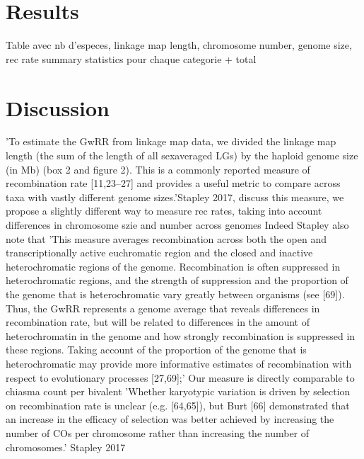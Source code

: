 \documentclass{article}
\begin{document}
\section*{Results}


Table avec nb d'especes, linkage map length, chromosome number, genome size, rec rate summary statistics pour chaque categorie + total


\section*{Discussion}


'To estimate the GwRR from linkage map data, we divided the linkage map length (the sum of the length of all sexaveraged LGs) by the haploid genome size (in Mb) (box 2 and figure 2). This is a commonly reported measure of recombination rate [11,23–27] and provides a useful metric to compare across taxa with vastly different genome sizes.'Stapley 2017, discuss this measure, we propose a slightly different way to measure rec rates, taking into account differences in chromosome szie and number across genomes
Indeed Stapley also note that 'This measure averages recombination across both the open and transcriptionally active euchromatic region and the closed and inactive heterochromatic regions of the genome. Recombination is often suppressed in heterochromatic regions, and the strength of suppression and the proportion of the genome that is heterochromatic vary greatly between organisms (see [69]). Thus, the GwRR represents a genome average that reveals differences in recombination rate, but will be related to differences in the amount of heterochromatin in the genome and how strongly recombination is suppressed in these regions. Taking account of the proportion of the genome that is heterochromatic may provide more informative estimates of recombination with respect to evolutionary processes [27,69];'
Our measure is directly comparable to chiasma count per bivalent
'Whether karyotypic variation is driven by selection on recombination rate is unclear (e.g. [64,65]), but Burt [66] demonstrated that an increase in the efficacy of selection was better achieved by increasing the number of COs per chromosome rather than increasing the number of chromosomes.' Stapley 2017
\end{document}

